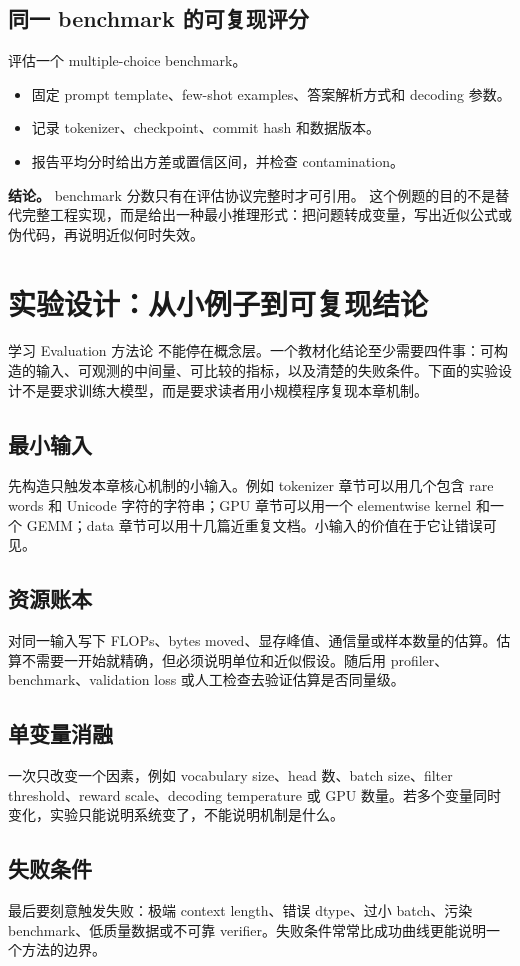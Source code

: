 \documentclass[a4paper]{article}
\begin{document}
\subsection{同一 benchmark 的可复现评分}
评估一个 multiple-choice benchmark。
\begin{itemize}
\item 固定 prompt template、few-shot examples、答案解析方式和 decoding 参数。
\item 记录 tokenizer、checkpoint、commit hash 和数据版本。
\item 报告平均分时给出方差或置信区间，并检查 contamination。
\end{itemize}
\textbf{结论。} benchmark 分数只有在评估协议完整时才可引用。
这个例题的目的不是替代完整工程实现，而是给出一种最小推理形式：把问题转成变量，写出近似公式或伪代码，再说明近似何时失效。
\section{实验设计：从小例子到可复现结论}
学习 Evaluation 方法论 不能停在概念层。一个教材化结论至少需要四件事：可构造的输入、可观测的中间量、可比较的指标，以及清楚的失败条件。下面的实验设计不是要求训练大模型，而是要求读者用小规模程序复现本章机制。
\subsection{最小输入}
先构造只触发本章核心机制的小输入。例如 tokenizer 章节可以用几个包含 rare words 和 Unicode 字符的字符串；GPU 章节可以用一个 elementwise kernel 和一个 GEMM；data 章节可以用十几篇近重复文档。小输入的价值在于它让错误可见。
\subsection{资源账本}
对同一输入写下 FLOPs、bytes moved、显存峰值、通信量或样本数量的估算。估算不需要一开始就精确，但必须说明单位和近似假设。随后用 profiler、benchmark、validation loss 或人工检查去验证估算是否同量级。
\subsection{单变量消融}
一次只改变一个因素，例如 vocabulary size、head 数、batch size、filter threshold、reward scale、decoding temperature 或 GPU 数量。若多个变量同时变化，实验只能说明系统变了，不能说明机制是什么。
\subsection{失败条件}
最后要刻意触发失败：极端 context length、错误 dtype、过小 batch、污染 benchmark、低质量数据或不可靠 verifier。失败条件常常比成功曲线更能说明一个方法的边界。
\end{document}
